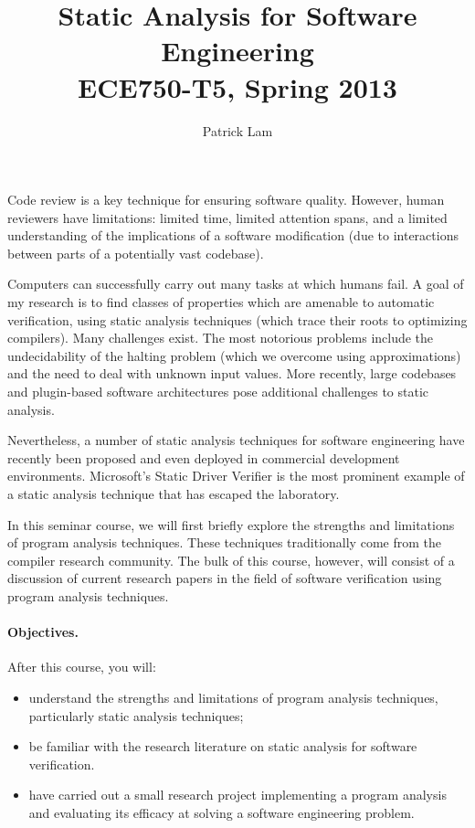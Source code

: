 \documentclass{article}
\begin{document}
\title{Static Analysis for Software Engineering\\ECE750-T5, Spring 2013}
\author{Patrick Lam}
\renewcommand{\today}{}
\maketitle
\vspace*{-2em}

Code review is a key technique for ensuring software quality. However,
human reviewers have limitations: limited time, limited attention
spans, and a limited understanding of the implications of a software
modification (due to interactions between parts of a potentially vast
codebase).

Computers can successfully carry out many tasks at which humans fail.
A goal of my research is to find classes of properties which are
amenable to automatic verification, using static analysis
techniques (which trace their roots to optimizing compilers). 
Many challenges exist. The most notorious
problems include the undecidability of the halting problem (which we
overcome using approximations) and the need to deal with unknown input
values. More recently, large codebases and plugin-based software
architectures pose additional challenges to static analysis.

Nevertheless, a number of static analysis techniques for software
engineering have recently been proposed and even deployed in commercial
development environments. Microsoft's Static Driver Verifier is the 
most prominent example of a static analysis technique that has escaped the
laboratory.

In this seminar course, we will first briefly explore the strengths and
limitations of program analysis techniques. These techniques
traditionally come from the compiler research community. The bulk of
this course, however, will consist of a discussion of current research papers
in the field of software verification using program analysis techniques.

\paragraph{Objectives.} After this course, you will:
\begin{itemize}
\item understand the strengths and limitations of program analysis
  techniques, particularly static analysis techniques;
\item be familiar with the research literature on static analysis for
  software verification.
\item have carried out a small research project implementing a program
  analysis and evaluating its efficacy at solving a software
  engineering problem.
\end{itemize}
\end{document}
